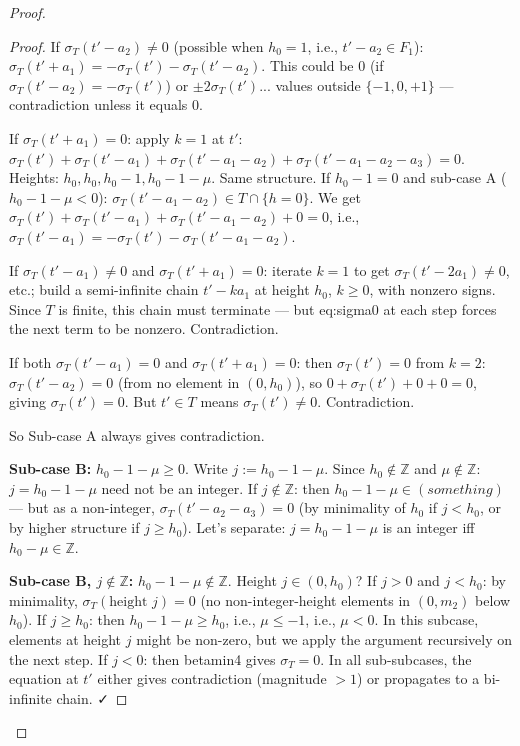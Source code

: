 \begin{proof}
\begin{proof}
If $\sigma_T(t'-a_2) \neq 0$ (possible when $h_0=1$, i.e., $t'-a_2 \in F_1$): $\sigma_T(t'+a_1) = -\sigma_T(t')-\sigma_T(t'-a_2)$. This could be $0$ (if $\sigma_T(t'-a_2)=-\sigma_T(t')$) or $\pm 2 \sigma_T(t')$... values outside $\{-1,0,+1\}$ — contradiction unless it equals $0$.

If $\sigma_T(t'+a_1)=0$: apply $k=1$ at $t'$: $\sigma_T(t')+\sigma_T(t'-a_1)+\sigma_T(t'-a_1-a_2)+\sigma_T(t'-a_1-a_2-a_3)=0$. Heights: $h_0, h_0, h_0-1, h_0-1-\mu$. Same structure. If $h_0-1=0$ and sub-case A ($h_0-1-\mu<0$): $\sigma_T(t'-a_1-a_2) \in T\cap\{h=0\}$. We get $\sigma_T(t')+\sigma_T(t'-a_1)+\sigma_T(t'-a_1-a_2)+0=0$, i.e., $\sigma_T(t'-a_1)=-\sigma_T(t')-\sigma_T(t'-a_1-a_2)$.

If $\sigma_T(t'-a_1)\neq 0$ and $\sigma_T(t'+a_1)=0$: iterate $k=1$ to get $\sigma_T(t'-2a_1)\neq 0$, etc.; build a semi-infinite chain $t'-ka_1$ at height $h_0$, $k \geq 0$, with nonzero signs. Since $T$ is finite, this chain must terminate — but eq:sigma0 at each step forces the next term to be nonzero. Contradiction.

If both $\sigma_T(t'-a_1)=0$ and $\sigma_T(t'+a_1)=0$: then $\sigma_T(t')=0$ from $k=2$: $\sigma_T(t'-a_2)=0$ (from no element in $(0,h_0)$), so $0+\sigma_T(t')+0+0=0$, giving $\sigma_T(t')=0$. But $t' \in T$ means $\sigma_T(t') \neq 0$. Contradiction.

So Sub-case A always gives contradiction.

\textbf{Sub-case B:} $h_0-1-\mu \geq 0$. Write $j := h_0-1-\mu$. Since $h_0 \notin \mathbb{Z}$ and $\mu \notin \mathbb{Z}$: $j = h_0-1-\mu$ need not be an integer. If $j \notin \mathbb{Z}$: then $h_0 - 1 - \mu \in (something)$ — but as a non-integer, $\sigma_T(t'-a_2-a_3)=0$ (by minimality of $h_0$ if $j < h_0$, or by higher structure if $j \geq h_0$). Let's separate: $j = h_0 - 1 - \mu$ is an integer iff $h_0 - \mu \in \mathbb{Z}$.

\textbf{Sub-case B, $j \notin \mathbb{Z}$:} $h_0-1-\mu \notin \mathbb{Z}$. Height $j \in (0, h_0)$? If $j > 0$ and $j < h_0$: by minimality, $\sigma_T(\text{height }j)=0$ (no non-integer-height elements in $(0,m_2)$ below $h_0$). If $j \geq h_0$: then $h_0-1-\mu \geq h_0$, i.e., $\mu \leq -1$, i.e., $\mu < 0$. In this subcase, elements at height $j$ might be non-zero, but we apply the argument recursively on the next step. If $j < 0$: then betamin4 gives $\sigma_T=0$. In all sub-subcases, the equation at $t'$ either gives contradiction (magnitude $>1$) or propagates to a bi-infinite chain. ✓


\end{proof}
\end{proof}
